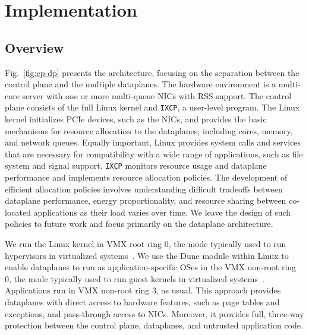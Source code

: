  
\section{\ix Implementation}
\label{sec:impl}





\subsection{Overview}
\label{sec:impl:overview}

Fig.~\ref{fig:cp-dp} presents the \ix architecture, focusing on the
separation between the control plane and the multiple dataplanes.  The
hardware environment is a multi-core server with one or more
multi-queue NICs with RSS support. The \ix control plane consists of the full Linux kernel and
\texttt{IXCP}, a user-level program. The Linux kernel
initializes PCIe devices, such as the NICs, and provides the basic
mechanisms for resource allocation to the dataplanes, including cores,
memory, and network queues. Equally important, Linux provides system
calls and services that are necessary for compatibility with a wide
range of applications, such as file system and signal
support. \texttt{IXCP} monitors resource usage and dataplane
performance and implements resource allocation policies. The
development of efficient allocation policies involves understanding
difficult tradeoffs between dataplane performance, energy
proportionality, and resource sharing between co-located applications
as their load varies over time. We leave the design of such policies
to future work and focus primarily on the \ix dataplane architecture.

We run the Linux kernel in VMX root ring 0, the mode typically used to
run hypervisors in virtualized
systems~\cite{DBLP:journals/computer/UhligNRSMABKLS05}. We use the
Dune module within Linux to enable dataplanes to run as
application-specific OSes in the VMX non-root ring 0, the mode
typically used to run guest kernels in virtualized
systems~\cite{dune}.  Applications run in VMX non-root ring 3, as
usual.  This approach provides dataplanes with direct access to
hardware features, such as page tables and exceptions, and pass-through
access to NICs. Moreover, it provides full, three-way protection
between the control plane, dataplanes, and untrusted application code.

